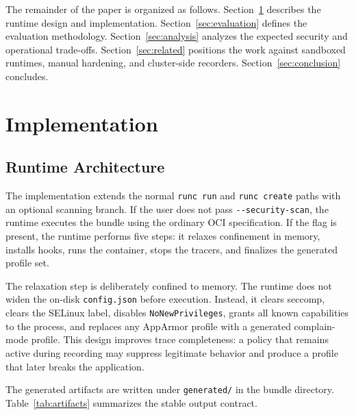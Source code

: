\documentclass[runningheads]{llncs}
\begin{document}
The remainder of the paper is organized as follows. Section~\ref{sec:implementation} describes the runtime design and implementation. Section~\ref{sec:evaluation} defines the evaluation methodology. Section~\ref{sec:analysis} analyzes the expected security and operational trade-offs. Section~\ref{sec:related} positions the work against sandboxed runtimes, manual hardening, and cluster-side recorders. Section~\ref{sec:conclusion} concludes.

\section{Implementation}\label{sec:implementation}

\subsection{Runtime Architecture}

The implementation extends the normal \texttt{runc run} and \texttt{runc create} paths with an optional scanning branch. If the user does not pass \texttt{-{}-security-scan}, the runtime executes the bundle using the ordinary OCI specification. If the flag is present, the runtime performs five steps: it relaxes confinement in memory, installs hooks, runs the container, stops the tracers, and finalizes the generated profile set.

The relaxation step is deliberately confined to memory. The runtime does not widen the on-disk \texttt{config.json} before execution. Instead, it clears seccomp, clears the SELinux label, disables \texttt{NoNewPrivileges}, grants all known capabilities to the process, and replaces any AppArmor profile with a generated complain-mode profile. This design improves trace completeness: a policy that remains active during recording may suppress legitimate behavior and produce a profile that later breaks the application.

The generated artifacts are written under \texttt{generated/} in the bundle directory. Table~\ref{tab:artifacts} summarizes the stable output contract.
\end{document}
